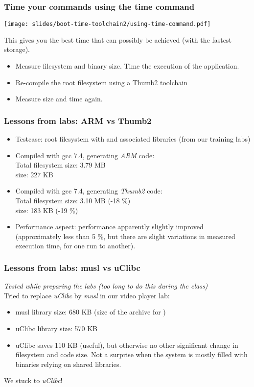 \begin{frame}
\frametitle{Time your commands using the time command}
\begin{center}
\texttt{[image: slides/boot-time-toolchain2/using-time-command.pdf]}
\end{center}
This gives you the best time that can possibly be achieved (with the fastest storage).
\end{frame}

{
\begin{itemize}
\item Measure filesystem and  binary size. Time
      the execution of the application.
\item Re-compile the root filesystem using a Thumb2 toolchain
\item Measure size and time again.
\end{itemize}
}


\begin{frame}
\frametitle{Lessons from labs: ARM vs Thumb2}
\begin{itemize}
\item Testcase: root filesystem with  and associated
      libraries (from our training labs)
\item Compiled with gcc 7.4, generating {\em ARM} code:\\
      Total filesystem size: 3.79 MB\\
       size: 227 KB
\item Compiled with gcc 7.4, generating {\em Thumb2} code:\\
      Total filesystem size: 3.10 MB (-18 \%)\\
       size: 183 KB (-19 \%)
\item Performance aspect: performance apparently slightly improved
      (approximately less than 5 \%, but there are slight variations in measured
      execution time, for one run to another).
\end{itemize}
\end{frame}

\begin{frame}
\frametitle{Lessons from labs: musl vs uClibc}
{\em Tested while preparing the labs (too long to do this during the
class)}\\

Tried to replace {\em uClibc} by {\em musl} in our video player lab:
\begin{itemize}
   \item musl library size: 680 KB (size of the  archive for )
   \item uClibc library size: 570 KB
   \item uClibc saves 110 KB (useful), but otherwise no other significant change
    in filesystem and code size. Not a surprise when the system is mostly filled
    with binaries relying on shared libraries.
\end{itemize}
We stuck to {\em uClibc}!
\end{frame}
